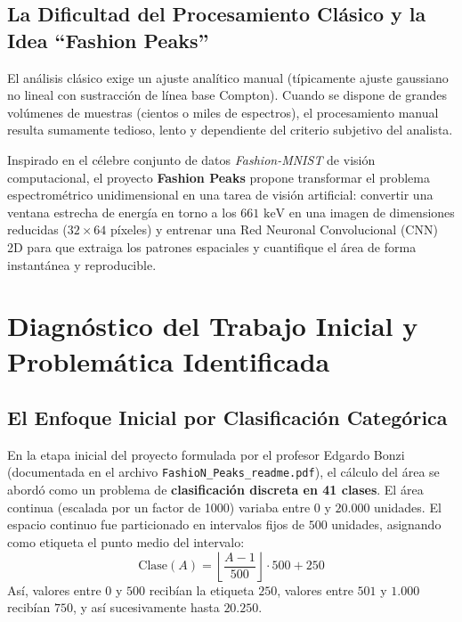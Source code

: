 \documentclass[11pt,a4paper]{article}
\begin{document}
\subsection{La Dificultad del Procesamiento Clásico y la Idea ``Fashion Peaks''}
El análisis clásico exige un ajuste analítico manual (típicamente ajuste gaussiano no lineal con sustracción de línea base Compton). Cuando se dispone de grandes volúmenes de muestras (cientos o miles de espectros), el procesamiento manual resulta sumamente tedioso, lento y dependiente del criterio subjetivo del analista.

Inspirado en el célebre conjunto de datos \textit{Fashion-MNIST} de visión computacional, el proyecto \textbf{Fashion Peaks} propone transformar el problema espectrométrico unidimensional en una tarea de visión artificial: convertir una ventana estrecha de energía en torno a los $661\text{ keV}$ en una imagen de dimensiones reducidas ($32 \times 64$ píxeles) y entrenar una Red Neuronal Convolucional (CNN) 2D para que extraiga los patrones espaciales y cuantifique el área de forma instantánea y reproducible.

\section{Diagnóstico del Trabajo Inicial y Problemática Identificada}

\subsection{El Enfoque Inicial por Clasificación Categórica}
En la etapa inicial del proyecto formulada por el profesor Edgardo Bonzi (documentada en el archivo \texttt{FashioN\_Peaks\_readme.pdf}), el cálculo del área se abordó como un problema de \textbf{clasificación discreta en 41 clases}. El área continua (escalada por un factor de 1000) variaba entre $0$ y $20.000$ unidades. El espacio continuo fue particionado en intervalos fijos de $500$ unidades, asignando como etiqueta el punto medio del intervalo:
\begin{equation}
\text{Clase}(A) = \left\lfloor \frac{A - 1}{500} \right\rfloor \cdot 500 + 250
\end{equation}
Así, valores entre $0$ y $500$ recibían la etiqueta $250$, valores entre $501$ y $1.000$ recibían $750$, y así sucesivamente hasta $20.250$.
\end{document}
